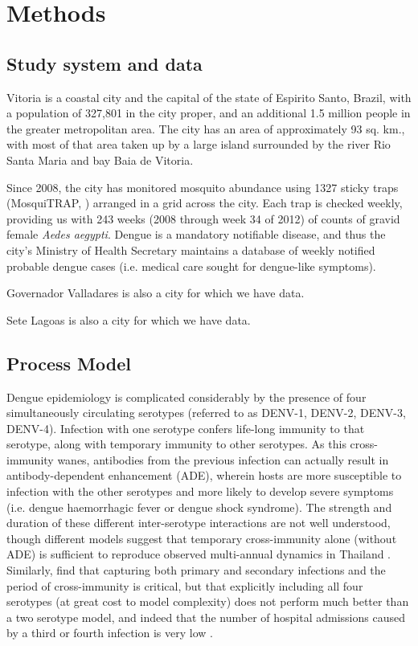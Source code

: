\documentclass[10pt,letterpaper]{article}
\begin{document}
\section*{Methods}

\subsection*{Study system and data}

Vitoria is a coastal city and the capital of the state of Espirito Santo, Brazil, with a population of 327,801 in the city proper, and an additional 1.5 million people in the greater metropolitan area.  
The city has an area of approximately 93 sq. km., with most of that area taken up by a large island surrounded by the river Rio Santa Maria and bay Baia de Vitoria.  

Since 2008, the city has monitored mosquito abundance using 1327 sticky traps (MosquiTRAP, \cite{Eiras2009}) arranged in a grid across the city.
Each trap is checked weekly, providing us with 243 weeks (2008 through week 34 of 2012) of counts of gravid female \emph{Aedes aegypti}.
Dengue is a mandatory notifiable disease, and thus the city's Ministry of Health Secretary maintains a database of weekly notified probable dengue cases (i.e. medical care sought for dengue-like symptoms).

Governador Valladares is also a city for which we have data.

Sete Lagoas is also a city for which we have data.


\subsection*{Process Model}

Dengue epidemiology is complicated considerably by the presence of four simultaneously circulating serotypes (referred to as DENV-1, DENV-2, DENV-3, DENV-4).
Infection with one serotype confers life-long immunity to that serotype, along with temporary immunity to other serotypes.  
As this cross-immunity wanes, antibodies from the previous infection can actually result in antibody-dependent enhancement (ADE), wherein hosts are more susceptible to infection with the other serotypes and more likely to develop severe symptoms (i.e. dengue haemorrhagic fever or dengue shock syndrome).
The strength and duration of these different inter-serotype interactions are not well understood, though different models suggest that temporary cross-immunity alone (without ADE) is sufficient to reproduce observed multi-annual dynamics in Thailand \cite{Wearing2006,Reich2013}.
Similarly, \cite{Aguiar2013} find that capturing both primary and secondary infections and the period of cross-immunity is critical, but that explicitly including all four serotypes (at great cost to model complexity) does not perform much better than a two serotype model, and indeed that the number of hospital admissions caused by a third or fourth infection is very low \cite{Aguiar2011a}.
\end{document}
